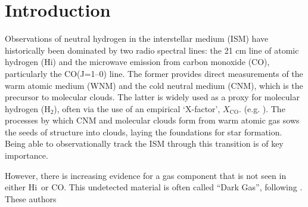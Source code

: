\documentclass[preprint]{emulateapj}
\def\hi{H{\sc i}}
\def\xco{$X_\mathrm{CO}$}
\begin{document}

\section{Introduction}
Observations of neutral hydrogen in the interstellar medium (ISM) have historically been dominated by two radio spectral lines: the 21 cm line of atomic hydrogen (\hi) and the microwave emission from carbon monoxide (CO), particularly the CO(J=1--0) line. The former provides direct measurements of the warm atomic medium (WNM) and the cold neutral medium (CNM), which is the precursor to molecular clouds. The latter is widely used as a proxy for molecular hydrogen (H$_2$), often via the use of an empirical `X-factor', \xco. %
(e.g. \citealt{Bolatto2013}). The processes by which CNM and molecular clouds form from warm atomic gas sows the seeds of structure into clouds, laying the foundations for star formation. Being able to observationally track the ISM through this transition is of key importance. %
\par
However, there is increasing evidence for a gas component that is not seen in either \hi\ or CO. This undetected material is often called ``Dark Gas'', following \cite{Grenier2005}. These authors %
\end{document}
